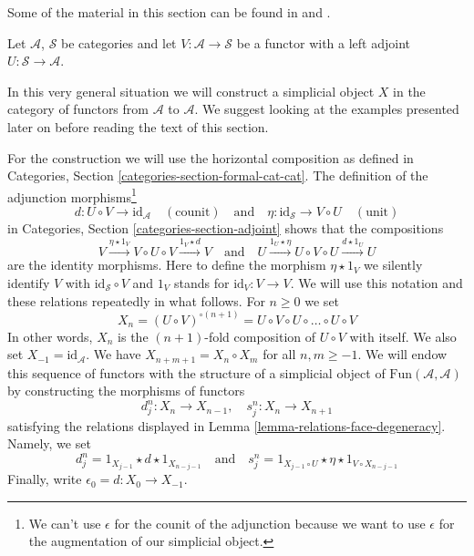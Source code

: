 \noindent
Some of the material in this section can be found in
\cite[Appendix 1]{Godement} and \cite[I 1.5]{cotangent}.

\begin{situation}
\label{situation-adjoint-functors}
Let $\mathcal{A}$, $\mathcal{S}$ be categories and let
$V : \mathcal{A} \to \mathcal{S}$ be a functor with a left adjoint
$U : \mathcal{S} \to \mathcal{A}$.
\end{situation}

\noindent
In this very general situation we will construct a simplicial
object $X$ in the category of functors from $\mathcal{A}$ to $\mathcal{A}$.
We suggest looking at the examples presented later on before reading
the text of this section.

\medskip\noindent
For the construction we will use the horizontal composition as
defined in Categories, Section \ref{categories-section-formal-cat-cat}.
The definition of the adjunction morphisms\footnote{We can't use
$\epsilon$ for the counit of the adjunction
because we want to use $\epsilon$ for the
augmentation of our simplicial object.}
$$
d : U \circ V \to \text{id}_\mathcal{A} \quad (\text{counit})
\quad\text{and}\quad
\eta : \text{id}_\mathcal{S} \to V \circ U \quad (\text{unit})
$$
in Categories, Section \ref{categories-section-adjoint}
shows that the compositions
\begin{equation}
\label{equation-composition}
V \xrightarrow{\eta \star 1_V} V \circ U \circ V \xrightarrow{1_V \star d} V
\quad\text{and}\quad
U \xrightarrow{1_U \star \eta} U \circ V \circ U \xrightarrow{d \star 1_U} U
\end{equation}
are the identity morphisms. Here to define the morphism $\eta \star 1_V$ we
silently identify $V$ with $\text{id}_\mathcal{S} \circ V$ and
$1_V$ stands for $\text{id}_V : V \to V$. We will use this notation and
these relations repeatedly in what follows.
For $n \geq 0$ we set
$$
X_n = (U \circ V)^{\circ (n + 1)} =
U \circ V \circ U \circ \ldots \circ U \circ V
$$
In other words, $X_n$ is the $(n + 1)$-fold composition of $U \circ V$
with itself. We also set $X_{-1} = \text{id}_\mathcal{A}$.
We have $X_{n + m + 1} = X_n \circ X_m$ for all $n, m \geq -1$.
We will endow this sequence of functors with the structure of a
simplicial object of $\text{Fun}(\mathcal{A}, \mathcal{A})$ by constructing
the morphisms of functors
$$
d^n_j : X_n \to X_{n - 1},\quad s^n_j : X_n \to X_{n + 1}
$$
satisfying the relations displayed in
Lemma \ref{lemma-relations-face-degeneracy}.
Namely, we set
$$
d^n_j = 1_{X_{j - 1}} \star d \star 1_{X_{n - j - 1}}
\quad\text{and}\quad
s^n_j = 1_{X_{j - 1} \circ U} \star \eta \star 1_{V \circ X_{n - j - 1}}
$$
Finally, write $\epsilon_0 = d : X_0 \to X_{-1}$.

